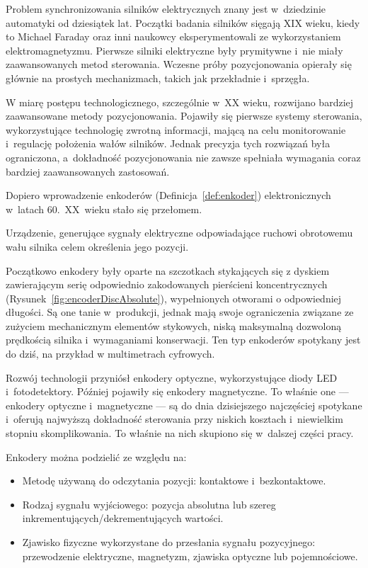 Problem synchronizowania silników elektrycznych znany jest w~dziedzinie automatyki od dziesiątek lat. Początki badania silników sięgają XIX wieku, kiedy to Michael Faraday oraz inni naukowcy eksperymentowali ze wykorzystaniem elektromagnetyzmu\cite{bib:pierwszesilniki}. Pierwsze silniki elektryczne były prymitywne i~nie miały zaawansowanych metod sterowania. Wczesne próby pozycjonowania opierały się głównie na prostych mechanizmach, takich jak przekładnie i~sprzęgła.

W miarę postępu technologicznego, szczególnie w~XX wieku, rozwijano bardziej zaawansowane metody pozycjonowania. Pojawiły się pierwsze systemy sterowania, wykorzystujące technologię zwrotną informacji, mającą na celu monitorowanie i~regulację położenia wałów silników. Jednak precyzja tych rozwiązań była ograniczona, a~dokładność pozycjonowania nie zawsze spełniała wymagania coraz bardziej zaawansowanych zastosowań.

Dopiero wprowadzenie enkoderów (Definicja~\ref{def:enkoder}) elektronicznych w~latach 60.~XX~wieku\cite{bib:pierwszeenkodery} stało się przełomem.

\begin{Definition}\label{def:enkoder}
    Urządzenie, generujące sygnały elektryczne odpowiadające ruchowi obrotowemu wału silnika celem określenia jego pozycji. 
\end{Definition}

Początkowo enkodery były oparte na szczotkach stykających się z dyskiem zawierającym serię odpowiednio zakodowanych pierścieni koncentrycznych (Rysunek~\ref{fig:encoderDiscAbsolute}), wypełnionych otworami o odpowiedniej długości\cite{bib:rodzajeenkoderow}. Są one tanie w~produkcji, jednak mają swoje ograniczenia związane ze zużyciem mechanicznym elementów stykowych, niską maksymalną dozwoloną prędkością silnika i~wymaganiami konserwacji. Ten typ enkoderów spotykany jest do dziś, na przykład w multimetrach cyfrowych.

Rozwój technologii przyniósł enkodery optyczne, wykorzystujące diody LED i~fotodetektory. Później pojawiły się enkodery magnetyczne. To właśnie one --- enkodery optyczne i~magnetyczne --- są do dnia dzisiejszego najczęściej spotykane i~oferują najwyższą dokładność sterowania przy niskich kosztach i~niewielkim stopniu skomplikowania. To właśnie na nich skupiono się w~dalszej części pracy.

Enkodery można podzielić ze względu na\cite{bib:rodzajeenkoderow}:
\begin{itemize}
    \item Metodę używaną do odczytania pozycji: kontaktowe i~bezkontaktowe.
    \item Rodzaj sygnału wyjściowego: pozycja absolutna lub szereg inkrementujących/dekrementujących wartości.
    \item Zjawisko fizyczne wykorzystane do przesłania sygnału pozycyjnego: przewodzenie elektryczne, magnetyzm, zjawiska optyczne lub pojemnościowe.
\end{itemize}

